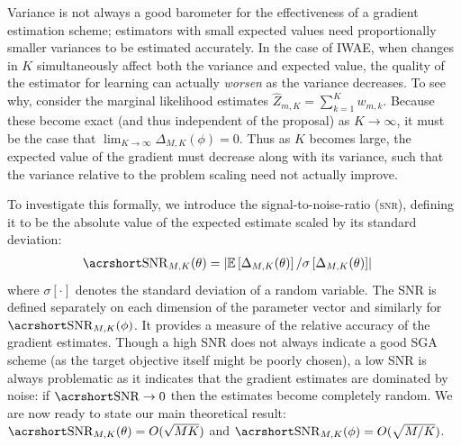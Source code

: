 Variance is not always a good barometer for the effectiveness
of a gradient estimation scheme; estimators with small expected values need proportionally smaller variances to 
be estimated accurately. In the case of \gls{IWAE}, when changes in $K$ simultaneously affect both the variance and
expected value, the quality of the estimator for learning can actually \emph{worsen} as the variance decreases.
To see why, consider
the marginal likelihood estimates $\hat{Z}_{m,K}^{} =\sum_{k=1}^{K} w_{m,k}^{}$. Because these become exact (and thus independent of the proposal) as $K\to\infty$, it must be the case that 
$\lim_{K\rightarrow\infty} {\Delta}_{M,K} (\phi) = 0$. 
Thus as $K$ becomes large, the expected value of the gradient
must decrease along with its variance, such that the variance relative to the problem scaling
need not actually improve.

To investigate this formally, we introduce the signal-to-noise-ratio (\textsc{snr}),
defining it to be the absolute value of the expected estimate scaled by its standard deviation:
\begin{align}
\SNR_{M,K} (\theta) &= \left|\E \left[\Delta_{M,K} (\theta)\right]/
\sigma\left[\Delta_{M,K} (\theta)\right]\right|
\end{align}
where $\sigma [\cdot]$ denotes the standard deviation of a random variable.
The \gls{SNR} is defined separately on each dimension of the parameter vector and
similarly for $\SNR_{M,K} (\phi)$. It provides a measure of the relative accuracy of the gradient estimates. Though a high \gls{SNR}
does not always indicate a good \gls{SGA} scheme (as the target objective itself might be
poorly chosen), a low \gls{SNR} is always problematic as it indicates that
the gradient estimates are dominated by noise: if $\SNR\to0$ then the estimates
become completely random.  We are now ready to state our main
theoretical result:  
$\SNR_{M,K} (\theta) = O(\sqrt{MK})$ and
$\SNR_{M,K} (\phi) = O(\sqrt{M/K})$.

